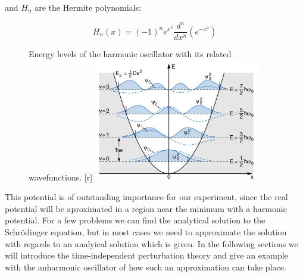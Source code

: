and $H_n$ are the Hermite polynomials: 

\begin{equation}
    H_n(x)=(-1)^n e^{x^2}\frac{d^n}{dx^n}\left(e^{-x^2}\right) 
\end{equation}

\begin{figure}[!t]
    \begin{captionbeside}[]{
        Energy levels of the harmonic oscillator with its 
        related wavefunctions\cite{Demtroeder1}.
        }[r]
    \includegraphics[width=0.65\textwidth]{pics/harmonic1}
    \end{captionbeside}
    \label{fig:harmonic1}
\end{figure}

This potential is of outstanding importance for our experiment,
since the real potential will be aproximated in a region near
the minimum with a harmonic potential. 
For a few problems we can find the analytical solution
to the Schrödinger equation, but in most cases 
we need to approximate the solution with regards to an analyical
solution which is given. In the following sections we will introduce
the time-independent perturbation theory and give an example with the 
anharmonic oscillator of how such an approximation can take place.
\FloatBarrier


